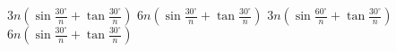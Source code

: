 \documentclass{article}
\begin{document}

  \begin{xchoice}
    \xitem 
    $3 n(\sin \frac{30^{\circ}}{n}+\tan \frac{30^{\circ}}{n})$
    \xitem 
    $6 n(\sin \frac{30^{\circ}}{n}+\tan \frac{30^{\circ}}{n})$
    \xitem
    $3 n(\sin \frac{60^{\circ}}{n}+\tan \frac{30^{\circ}}{n})$
    \xitem
    $6 n(\sin \frac{30^{\circ}}{n}+\tan \frac{30^{\circ}}{n})$ 
  \end{xchoice}
\end{document}
